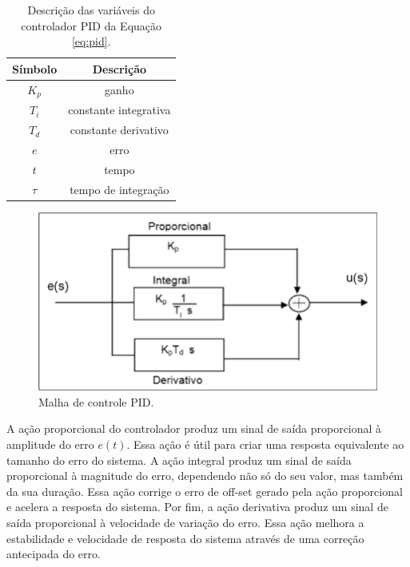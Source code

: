 \begin{table}[H]
    \begin{center}
        \begin{tabular}{ |c|c| } 
            \hline
            Símbolo   &  Descrição  \\
            \hline
            \(K_p\)   &  ganho   \\
            \hline
            \(T_i\)   &  constante integrativa  \\
            \hline
            \(T_d\)   &  constante derivativo  \\
            \hline
            \(e\)   &  erro  \\
            \hline
            \(t\)   &  tempo  \\
            \hline
            \(\tau\)   &  tempo de integração \\
            \hline
        \end{tabular}
        \caption{\label{tab:variaveis_pid}Descrição das variáveis do controlador PID da Equação \ref{eq:pid}.}
    \end{center}
\end{table}

\begin{figure}[h]
    \centering
    \includegraphics[scale=0.40]{figuras/implementacao/hardware/pid.png}
    \caption{Malha de controle PID.}
    \label{fig:pid}
\end{figure}


A ação proporcional do controlador produz um sinal de saída proporcional à amplitude do erro $e(t)$. Essa ação é útil para criar uma resposta equivalente ao tamanho do erro do sistema. A ação integral produz um sinal de saída proporcional à magnitude do erro, dependendo não só do seu valor, mas também da sua duração. Essa ação corrige o erro de off-set gerado pela ação proporcional e acelera a resposta do sistema. Por fim, a ação derivativa produz um sinal de saída proporcional à velocidade de variação do erro. Essa ação melhora a estabilidade e velocidade de resposta do sistema através de uma correção antecipada do erro. 


